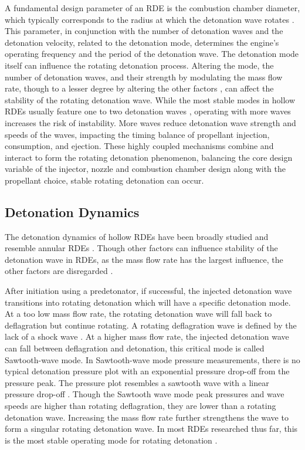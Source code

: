 \documentclass{article}
\begin{document}
A fundamental design parameter of an RDE is the combustion chamber diameter, which typically corresponds to the radius at which the detonation wave rotates \cite{1Huang2023}. This parameter, in conjunction with the number of detonation waves and the detonation velocity, related to the detonation mode, determines the engine’s operating frequency and the period of the detonation wave. The detonation mode itself can influence the rotating detonation process. Altering the mode, the number of detonation waves, and their strength by modulating the mass flow rate, though to a lesser degree by altering the other factors \cite{Xie2018}, can affect the stability of the rotating detonation wave. While the most stable modes in hollow RDEs usually feature one to two detonation waves \cite{1Zhang2021}, operating with more waves increases the risk of instability. More waves reduce detonation wave strength and speeds of the waves, impacting the timing balance of propellant injection, consumption, and ejection. These highly coupled mechanisms combine and interact to form the rotating detonation phenomenon, balancing the core design variable of the injector, nozzle and combustion chamber design along with the propellant choice, stable rotating detonation can occur. 

\subsection{Detonation Dynamics}

The detonation dynamics of hollow RDEs have been broadly studied and resemble annular RDEs \cite{Schwer2020,Schwer2021}. Though other factors can influence stability of the detonation wave in RDEs, as the mass flow rate has the largest influence, the other factors are disregarded \cite{Xie2018}.
\par

After initiation using a predetonator, if successful, the injected detonation wave transitions into rotating detonation which will have a specific detonation mode. At a too low mass flow rate, the rotating detonation wave will fall back to deflagration but continue rotating. A rotating deflagration wave is defined by the lack of a shock wave \cite{Huang2019,1Huang2019}. At a higher mass flow rate, the injected detonation wave can fall between deflagration and detonation, this critical mode is called Sawtooth-wave mode. In Sawtooth-wave mode pressure measurements, there is no typical detonation pressure plot with an exponential pressure drop-off from the pressure peak. The pressure plot resembles a sawtooth wave with a linear pressure drop-off  \cite{Huang2019,1Huang2019,Peng2022}. Though the Sawtooth wave mode peak pressures and wave speeds are higher than rotating deflagration, they are lower than a rotating detonation wave. Increasing the mass flow rate further strengthens the wave to form a singular rotating detonation wave. In most RDEs researched thus far, this is the most stable operating mode for rotating detonation \cite{Huang2019,1Huang2019}. 
\par
\end{document}
